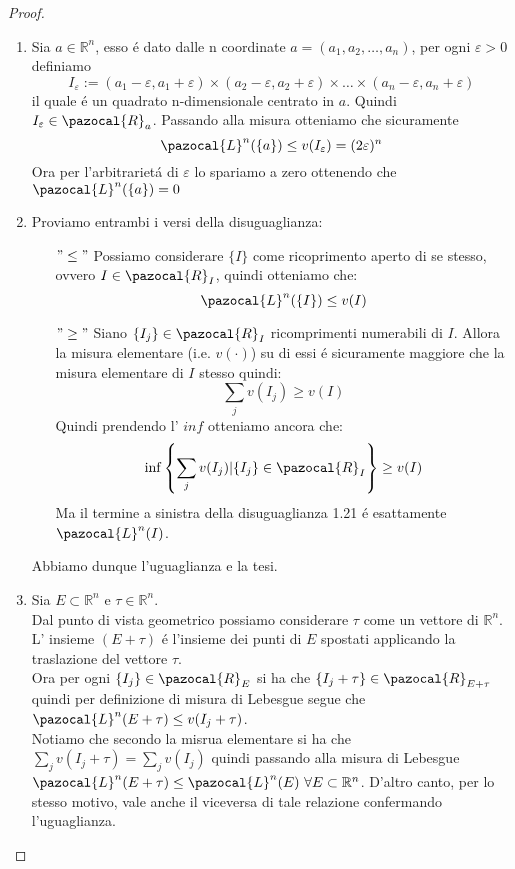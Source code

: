 \documentclass[11pt,a4paper]{report}
\theoremstyle{plain}
\theoremstyle{definition}
\newcommand{\Le}{\pazocal{L}}
\begin{document}
\begin{proof}
	\begin{enumerate}
		\item Sia $a \in \mathbb{R}^n$, esso \'e dato dalle n coordinate $a = (a_1, a_2, \ldots, a_n)$, per ogni $\varepsilon > 0$ definiamo 
		\[
		I_\varepsilon := (a_1 - \varepsilon, a_1 + \varepsilon) \times (a_2 - \varepsilon, a_2 + \varepsilon) \times \ldots \times (a_n - \varepsilon, a_n + \varepsilon)
		\]
		il quale \'e un quadrato n-dimensionale centrato in $a$. Quindi $I_\varepsilon \in \pazocal{R}_a$. Passando alla misura otteniamo che sicuramente
		\[
			\Le^n(\{a\}) \le v(I_\varepsilon) = (2\varepsilon)^n		
		\]
		Ora per l'arbitrariet\'a di $\varepsilon$ lo spariamo a zero ottenendo che $\Le^n(\{a\}) = 0$
		\item Proviamo entrambi i versi della disuguaglianza:
		\begin{itemize}
			\item[$"\le"$] Possiamo considerare $\{I\}$ come ricoprimento aperto di se stesso, ovvero $I \in \pazocal{R}_I$, quindi otteniamo che:
			\[
				\Le^n(\{I\}) \le v(I)
			\]
			\item[$"\ge"$] Siano $\{I_j\} \in \pazocal{R}_I$ ricomprimenti numerabili di $I$. Allora la misura elementare (i.e. $v(\cdot)$) su di essi \'e sicuramente maggiore che la misura elementare di $I$ stesso quindi:
				\[
					\sum\limits_{j}v(I_j) \ge v(I)
				\]
				Quindi prendendo l' $inf$ otteniamo ancora che:
				\begin{equation}
					\inf\left\{\sum\limits_{j}v(I_j) | \{I_j\} \in \pazocal{R}_I\right\} \ge v(I)
				\end{equation}
				Ma il termine a sinistra della disuguaglianza 1.21 \'e esattamente $\Le^n(I)$.
		\end{itemize}
		Abbiamo dunque l'uguaglianza e la tesi.
		\item Sia $E \subset \mathbb{R}^n$ e $\tau \in \mathbb{R}^n$.\\
		Dal punto di vista geometrico possiamo considerare $\tau$ come un vettore di $\mathbb{R}^n$. L' insieme $(E + \tau)$ \'e l'insieme dei punti di $E$ spostati applicando la traslazione del vettore $\tau$.\\
		Ora per ogni $\{I_j\} \in \pazocal{R}_E$ si ha che $\{I_j + \tau\} \in \pazocal{R}_{E+\tau}$ quindi per definizione di misura di Lebesgue segue che $\Le^n(E+\tau) \le v(I_j + \tau)$.\\
		Notiamo che secondo la misrua elementare si ha che $\sum\limits_{j}v(I_j + \tau) = \sum\limits_{j}v(I_j)$ quindi passando alla misura di Lebesgue $\Le^n(E + \tau) \le \Le^n(E)\ \forall E \subset \mathbb{R}^n$. D'altro canto, per lo stesso motivo, vale anche il viceversa di tale relazione confermando l'uguaglianza.\\

\end{enumerate}
\end{proof}
\end{document}
